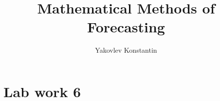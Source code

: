\documentclass[a4paper,14pt]{article}
\title{Mathematical Methods of Forecasting}
\date{}
\author{Yakovlev Konstantin}
\numberwithin{equation}{section}
\begin{document}
    \maketitle
    \tableofcontents
    
    \clearpage
    \section{Lab work 6} %
    {} %
    

    \clearpage
    \printbibliography
\end{document}
